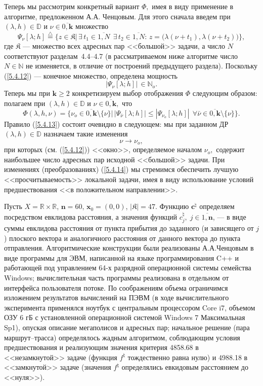 \documentclass[11pt,twoside,openany]{report}
\newcommand{\bfn}{\begin{equation}}
\newcommand{\efn}{\end{equation}}
\newcommand{\df}{\stackrel{\triangle}{=}}
\newcommand{\ov}{\overline}
\newcommand{\la}{\lambda}
\newcommand{\fa}{\forall}
\newcommand{\bbd}{{\mathbb D}}
\newcommand{\bbn}{{\mathbb N}}
\begin{document}
{{Теперь мы рассмотрим конкретный вариант $\Phi,$ имея в виду применение
в алгоритме, предложенном А.А. Ченцовым. Для этого сначала введем при
$(\la,h)\in \bbd$ и $\nu\in \ov{0,\mathbf{k}}$ множество
\bfn\label{5.4.12}
\Psi_\nu[\la;h] \df \bigl\{z\in \mathfrak{K}|\,\exists\,t_1\in
\ov{1,N}\ \ \exists\,t_2\in \ov{1,N}:\,z = \bigl(\la(\nu+t_1),
\la(\nu+t_2)\bigl)\bigl\},
\efn
где $\mathfrak{K}$ --- множество всех адресных пар <<большой>>
задачи, а число $N$ соответствуют разделам~4.4--4.7 (в рассматриваемом
ниже алгоритме число $N\in \bbn$ не изменяется, в отличие от построений
предыдущего раздела). Поскольку (\ref{5.4.12}) --- конечное множество,
определена мощность
$$
|\Psi_\nu[\la;h]|\,\in \bbn_o.
$$
Теперь мы при $\mathbf{k}\geqslant 2$ конкретизируем выбор отображения
$\Phi$ следующим образом: полагаем при $(\la,h)\in \bbd$ и $\nu\in
\ov{0,\mathbf{k}},$ что
\bfn\label{5.4.13}
\Phi(\la,h,\nu) = \bigl\{\nu_o\in \ov{0,\mathbf{k}}\setminus
\{\nu\}\bigl|\,|\Psi_{\bar{\nu}}[\la;h]|\leqslant |\Psi_{\nu_o}[\la;h]|\ \
\fa \bar{\nu}\in \ov{0,\mathbf{k}}\setminus \{\nu\}\bigl\}.
\efn
Правило (\ref{5.4.13}) состоит очевидно в следующем: мы при заданном
ДР $(\la,h)\in \bbd$ назначаем такие изменения
\bfn\label{5.4.14}\nu\longrightarrow \nu_o,
\efn
при которых (см. (\ref{5.4.12})) <<окно>>, определяемое началом $\nu_o,$
содержит наибольшее число адресных пар исходной <<большой>> задачи.
При изменениях (преобразованиях) (\ref{5.4.14}) мы стремимся обеспечить
лучшую <<просчитываемость>> локальной задачи, имея в виду использование
условий предшествования <<в положительном направлении>>.



Пусть $X=\mathbb{R}\times\mathbb{R}$, $\mathbf{n}=60$,
$\mathbf{x}_0=(0,0)$,
$\vert \mathfrak{K} \vert=47$. Функцию $\mathbf{c}^{\natural}$ определяем посредством евклидова расстояния,
а значения функций $c_j^{\natural},\;j \in \overline{1,\mathbf{n}}$, --- в виде суммы евклидова расстояния
от пункта прибытия до заданного (и зависящего от $j$) плоского вектора и аналогичного расстояния от данного
вектора до пункта отправления. Алгоритмические конструкции были реализованы
А.А.Ченцовым в виде программы для ЭВМ, написанной на языке программирования C++
и работающей под управлением 64-х разрядной операционной
системы семейства Windows; вычислительная часть программы реализована в отдельном от интерфейса пользователя потоке.
По соображениям объема ограничимся изложением результатов вычислений на ПЭВМ
(в ходе вычислительного эксперимента применялся ноутбук с центральным процессором Core i7, объемом ОЗУ 6 гБ
с установленной операционной системой Windows 7 Максимальная Sp1), опуская описание мегаполисов и адресных пар;
начальное решение (пара маршрут--трасса) определялось жадным алгоритмом, соблюдающим условия предшествования
и реализующим значения критерия 4858.68 в <<незамкнутой>> задаче (функция $f^{\natural}$ тождественно равна нулю)
и 4988.18 в <<замкнутой>> задаче (значения $f^{\natural}$ определялись евкидовым расстоянием до <<нуля>>).

}}
\end{document}
